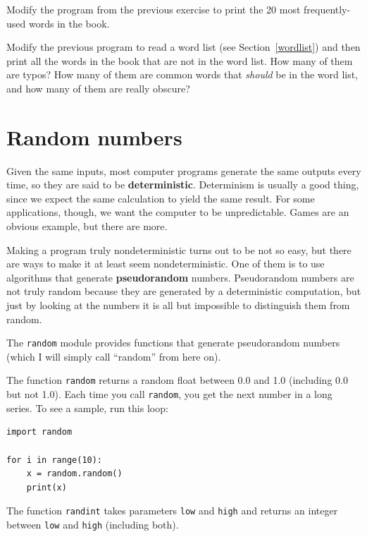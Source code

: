\documentclass[10pt]{book}
\begin{document}
\begin{ex}
Modify the program from the previous exercise to print the
20 most frequently-used words in the book.
\end{ex}


\begin{ex}
Modify the previous program to read a word list (see
Section~\ref{wordlist}) and then print all the words in the book that
are not in the word list.  How many of them are typos?  How many of
them are common words that {\em should} be in the word list, and how
many of them are really obscure?
\end{ex}


\section{Random numbers}


Given the same inputs, most computer programs generate the same
outputs every time, so they are said to be {\bf deterministic}.
Determinism is usually a good thing, since we expect the same
calculation to yield the same result.  For some applications, though,
we want the computer to be unpredictable.  Games are an obvious
example, but there are more.

Making a program truly nondeterministic turns out to be not so easy,
but there are ways to make it at least seem nondeterministic.  One of
them is to use algorithms that generate {\bf pseudorandom} numbers.
Pseudorandom numbers are not truly random because they are generated
by a deterministic computation, but just by looking at the numbers it
is all but impossible to distinguish them from random.


The {\tt random} module provides functions that generate
pseudorandom numbers (which I will simply call ``random'' from
here on).


The function {\tt random} returns a random float
between 0.0 and 1.0 (including 0.0 but not 1.0).  Each time you
call {\tt random}, you get the next number in a long series.  To see a
sample, run this loop:

\beforeverb
\begin{verbatim}
import random

for i in range(10):
    x = random.random()
    print(x)
\end{verbatim}
\afterverb
%
The function {\tt randint} takes parameters {\tt low} and
{\tt high} and returns an integer between {\tt low} and
{\tt high} (including both).
\end{document}
